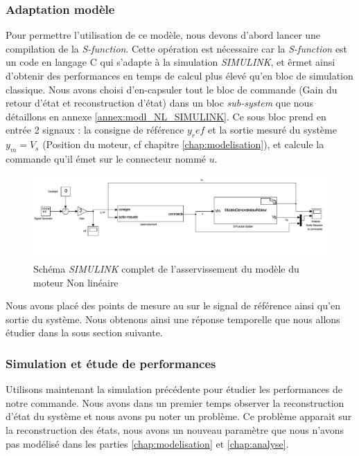 		\subsubsection{Adaptation modèle}
		Pour permettre l'utilisation de ce modèle, nous devons d'abord lancer une compilation de la \emph{S-function}. Cette opération est nécessaire car la \emph{S-function} est un code en langage C qui s'adapte à la simulation \emph{SIMULINK}, et êrmet ainsi d'obtenir des performances en temps de calcul plus élevé qu'en bloc de simulation classique.
		Nous avons choisi d'en-capsuler tout le bloc de commande (Gain du retour d'état et reconstruction d'état) dans un bloc \emph{sub-system} que nous détaillons en annexe \ref{annex:modl_NL_SIMULINK}. Ce sous bloc prend en entrée 2 signaux : la consigne de référence $y_ref$ et la sortie mesuré du système $y_m = V_s$ (Position du moteur, cf chapitre \ref{chap:modelisation}), et calcule la commande qu'il émet sur le connecteur nommé $u$.
		\begin{figure}[ht]
		\centering
		\includegraphics[width = \textwidth]{./IV/images/NL_RE_BlocEntier.pdf}
		\caption{Schéma \emph{SIMULINK} complet de l'asservissement du modèle du moteur Non linéaire}\label{fig:SIMULINK_NL_schema}
		\end{figure}
		
		Nous avons placé des points de mesure au sur le signal de référence ainsi qu'en sortie du système. Nous obtenons ainsi une réponse temporelle que nous allons étudier dans la sous section suivante.
		\subsubsection{Simulation et étude de performances}
		Utilisons maintenant la simulation précédente pour étudier les performances de notre commande. Nous avons dans un premier temps observer la reconstruction d'état du système et nous avons pu noter un problème. Ce problème apparait sur la reconstruction des états, nous avons un nouveau paramètre que nous n'avons pas modélisé dans les parties \ref{chap:modelisation} et \ref{chap:analyse}. 
		
